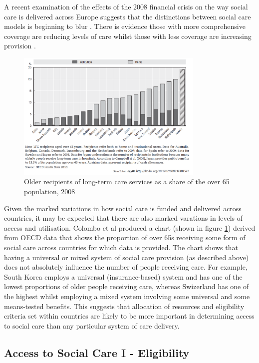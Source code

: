 \documentclass[12pt,]{report}
\begin{document}
A recent examination of the effects of the 2008 financial crisis on the
way social care is delivered across Europe suggests that the
distinctions between social care models is beginning to blur
\citep{RN343}. There is evidence those with more comprehensive coverage
are reducing levels of care whilst those with less coverage are
increasing provision \citep{RN414}.

\begin{figure}
  \centering
  \caption{Older recipients of long-term care services as a share of the over 65 population, 2008}
  \label{fig:oecd-comparison}
    \includegraphics[width=0.8\textwidth]{figures/oecd-comparison.PNG}
\end{figure}

Given the marked variations in how social care is funded and delivered
across countries, it may be expected that there are also marked
varations in levels of access and utilisation. Colombo et al
\citeyearpar{RN414} produced a chart (shown in figure
\ref{fig:oecd-comparison}) derived from OECD data that shows the
proportion of over 65s receiving some form of social care across
countries for which data is provided. The chart shows that having a
universal or mixed system of social care provision (as described above)
does not absolutely influence the number of people receiving care. For
example, South Korea employs a universal (insurance-based) system and
has one of the lowest proportions of older people receiving care,
whereas Swizerland has one of the highest whilst employing a mixed
system involving some universal and some means-tested benefits. This
suggests that allocation of resources and eligibility criteria set
within countries are likely to be more important in determining access
to social care than any particular system of care delivery.

\subsection{Access to Social Care I - Eligibility}\label{subsec:access-sc-eligibility}
\end{document}
